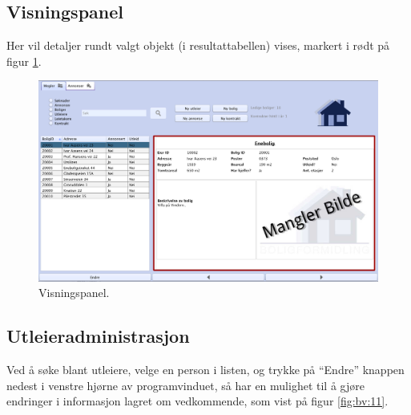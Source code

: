 \newpage
\subsection{Visningspanel}

Her vil detaljer rundt valgt objekt (i resultattabellen) vises, markert i rødt på figur \ref{fig:bv:10}.


\begin{figure}[h!]
 \includegraphics[width=\textwidth,height=\textheight,keepaspectratio]{./img/brukerveiledning/10.png}
 \caption{Visningspanel.}
 \label{fig:bv:10}
\end{figure}



\newpage
\subsection{Utleieradministrasjon}

Ved å søke blant utleiere, velge en person i listen, og trykke på “Endre” knappen nedest i venstre
hjørne av programvinduet, så har en mulighet til å gjøre endringer i informasjon lagret om
vedkommende, som vist på figur \ref{fig:bv:11}.

